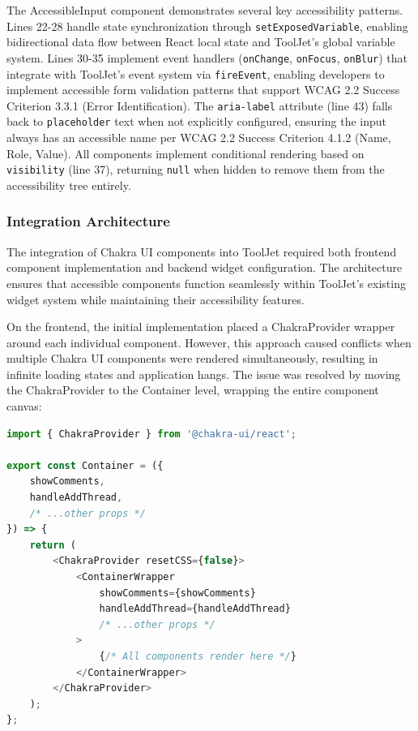 The AccessibleInput component demonstrates several key accessibility patterns. Lines 22-28 handle state synchronization through \texttt{setExposedVariable}, enabling bidirectional data flow between React local state and ToolJet's global variable system. Lines 30-35 implement event handlers (\texttt{onChange}, \texttt{onFocus}, \texttt{onBlur}) that integrate with ToolJet's event system via \texttt{fireEvent}, enabling developers to implement accessible form validation patterns that support WCAG 2.2 \cite{WCAG22} Success Criterion 3.3.1 (Error Identification). The \texttt{aria-label} attribute (line 43) falls back to \texttt{placeholder} text when not explicitly configured, ensuring the input always has an accessible name per WCAG 2.2 \cite{WCAG22} Success Criterion 4.1.2 (Name, Role, Value). All components implement conditional rendering based on \texttt{visibility} (line 37), returning \texttt{null} when hidden to remove them from the accessibility tree entirely.

\subsubsection{Integration Architecture}

The integration of Chakra UI components into ToolJet required both frontend component implementation and backend widget configuration. The architecture ensures that accessible components function seamlessly within ToolJet's existing widget system while maintaining their accessibility features.

On the frontend, the initial implementation placed a ChakraProvider wrapper around each individual component. However, this approach caused conflicts when multiple Chakra UI components were rendered simultaneously, resulting in infinite loading states and application hangs. The issue was resolved by moving the ChakraProvider to the Container level, wrapping the entire component canvas:

\begin{lstlisting}[language=JavaScript, caption=ChakraProvider Integration at Container Level]
import { ChakraProvider } from '@chakra-ui/react';

export const Container = ({ 
    showComments, 
    handleAddThread, 
    /* ...other props */ 
}) => {
    return (
        <ChakraProvider resetCSS={false}>
            <ContainerWrapper
                showComments={showComments}
                handleAddThread={handleAddThread}
                /* ...other props */
            >
                {/* All components render here */}
            </ContainerWrapper>
        </ChakraProvider>
    );
};
\end{lstlisting}


